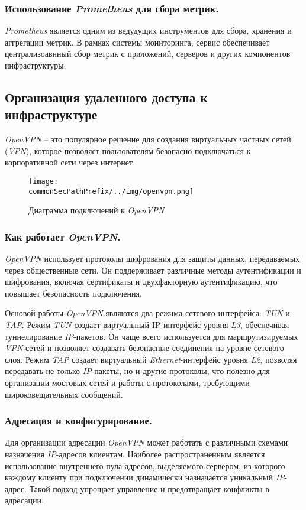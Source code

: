 \subsubsection{Использование \textit{Prometheus} для сбора метрик.}
\textit{Prometheus} является одним из ведудущих инструментов для сбора, хранения и аггрегации метрик. В рамках системы мониторинга, сервис обеспечивает централизоавнный сбор метрик с приложений, серверов и других компонентов инфраструктуры.

\subsection{Организация удаленного доступа к инфраструктуре}
\label{sec:vpn}
\textit{OpenVPN} -- это популярное решение для создания виртуальных частных сетей (\textit{VPN})\cite{openvpn}, которое позволяет пользователям безопасно подключаться к корпоративной сети через интернет.

\begin{figure}[ht]
    \centering
    \texttt{[image: \\commonSecPathPrefix/../img/openvpn.png]}
    \caption{Диаграмма подключений к \textit{OpenVPN}}
    \label{fig:user_guide:openvpn_diagram}
\end{figure}

\subsubsection{Как работает \textit{OpenVPN}.}
\textit{OpenVPN} использует протоколы шифрования для защиты данных, передаваемых через общественные сети. Он поддерживает различные методы аутентификации и шифрования, включая сертификаты и двухфакторную аутентификацию, что повышает безопасность подключения.

Основой работы \textit{OpenVPN} являются два режима сетевого интерфейса: \textit{TUN} и \textit{TAP}. Режим \textit{TUN} создает виртуальный IP-интерфейс уровня \textit{L3}, обеспечивая туннелирование \textit{IP}-пакетов. Он чаще всего используется для маршрутизируемых \textit{VPN}-сетей и позволяет создавать безопасные соединения на уровне сетевого слоя. Режим \textit{TAP} создает виртуальный \textit{Ethernet}-интерфейс уровня \textit{L2}, позволяя передавать не только \textit{IP}-пакеты, но и другие протоколы, что полезно для организации мостовых сетей и работы с протоколами, требующими широковещательных сообщений.

\subsubsection{Адресация и конфигурирование.}
Для организации адресации \textit{OpenVPN} может работать с различными схемами назначения \textit{IP}-адресов клиентам. Наиболее распространенным является использование внутреннего пула адресов, выделяемого сервером, из которого каждому клиенту при подключении динамически назначается уникальный \textit{IP}-адрес. Такой подход упрощает управление и предотвращает конфликты в адресации.

